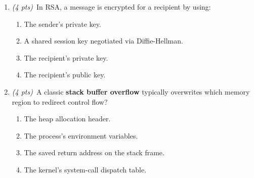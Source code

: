 \documentclass[11pt]{article}
\newcommand{\correctchoice}[1]{\ifanswers\textcolor{keygreen}{\textbf{#1}}\else #1\fi}
\newcommand{\wrongchoice}[1]{\ifanswers\textcolor{keygrey}{#1}\else #1\fi}
\newif\ifanswers
\begin{document}
\begin{enumerate}
\item \textit{(4 pts)}~In RSA, a message is encrypted for a recipient by using:
  \begin{enumerate}[label=(\alph*)]
    \item \wrongchoice{The sender's private key.}
    \item \wrongchoice{A shared session key negotiated via Diffie-Hellman.}
    \item \wrongchoice{The recipient's private key.}
    \item \correctchoice{The recipient's public key.}
  \end{enumerate}
  \ifanswers \par\smallskip\textcolor{keyred}{\textbf{Answer:} d}
    RSA encryption uses the \emph{recipient's public key}; only the recipient's
    matching private key can decrypt. (a) describes signing, not encryption.\par\smallskip\fi

\item \textit{(4 pts)}~A classic \textbf{stack buffer overflow} typically overwrites which
  memory region to redirect control flow?
  \begin{enumerate}[label=(\alph*)]
    \item \wrongchoice{The heap allocation header.}
    \item \wrongchoice{The process's environment variables.}
    \item \correctchoice{The saved return address on the stack frame.}
    \item \wrongchoice{The kernel's system-call dispatch table.}
  \end{enumerate}
  \ifanswers \par\smallskip\textcolor{keyred}{\textbf{Answer:} c}
    By writing past the end of a stack-allocated buffer, an attacker can overwrite the
    saved return address (and optionally the saved frame pointer) to redirect execution
    to attacker-controlled code or a gadget chain.\par\smallskip\fi


\end{enumerate}
\end{document}
